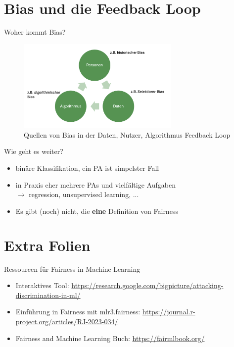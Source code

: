 \documentclass[aspectratio=169]{beamer}
\begin{document}
\section{Bias und die Feedback Loop}
\begin{frame}{Woher kommt Bias?}
	\begin{figure}
		\centering
		\includegraphics[width=0.7\textwidth]{../figures/bias_loop.png}
		\caption{Quellen von Bias in der Daten, Nutzer, Algorithmus Feedback Loop} %
	\end{figure}
\end{frame}

\begin{frame}{Wie geht es weiter?}
	\begin{itemize}
		\item<1-> binäre Klassifikation, ein PA ist simpelster Fall
		\item<2-> in Praxis eher mehrere PAs und vielfältige Aufgaben\\ $\rightarrow$ regression, unsupervised learning, ...
		\item<3-> Es gibt (noch) nicht, die \textbf{eine} Definition von Fairness
	\end{itemize}
\end{frame}

% 	
% 	

\section{Extra Folien}

\begin{frame}{Ressourcen für Fairness in Machine Learning}
    \begin{itemize}
        \item Interaktives Tool: \url{https://research.google.com/bigpicture/attacking-discrimination-in-ml/}
        \item Einführung in Fairness mit mlr3.fairness: \url{https://journal.r-project.org/articles/RJ-2023-034/}
        \item Fairness and Machine Learning Buch: \url{https://fairmlbook.org/}
    \end{itemize}
\end{frame}
\end{document}
